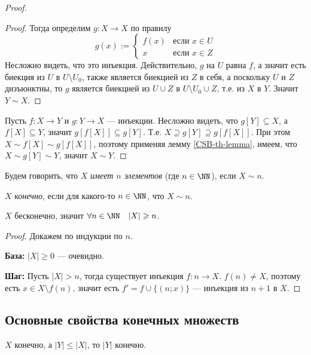 \documentclass[12pt,a4paper]{article}
\begin{document}
\begin{proof}
\begin{proof}
            Тогда определим $g: X \to X$ по правилу
            \[g(x) := \begin{cases}
                f(x) & \text{если $x \in U$}\\
                x & \text{если $x \in Z$}
            \end{cases}\]
            Несложно видеть, что это инъекция. Действительно, $g$ на $U$ равна $f$, а значит есть биекция из $U$ в $U\setminus U_0$, также является биекцией из $Z$ в себя, а поскольку $U$ и $Z$ дизъюнктны, то $g$ является биекцией из $U \cup Z$ в $U\setminus U_0 \cup Z$, т.е. из $X$ в $Y$. Значит $Y \sim X$.
        \end{proof}

        Пусть $f: X \to Y$ и $g: Y \to X$ --- инъекции. Несложно видеть, что $g[Y] \subseteq X$, а $f[X] \subseteq Y$, значит $g[f[X]] \subseteq g[Y]$. Т.е. $X \supseteq g[Y] \supseteq g[f[X]]$. При этом $X \sim f[X] \sim g[f[X]]$, поэтому применяя лемму \ref{CSB-th-lemma}, имеем, что $X \sim g[Y] \sim Y$, значит $X \sim Y$.
    \end{proof}

    \begin{definition}
        Будем говорить, что $X$ \emph{имеет $n$ элементов} (где $n \in \NN$), если $X \sim n$.

        $X$ \emph{конечно}, если для какого-то $n\in \NN$, что $X \sim n$.
    \end{definition}

    \begin{statement}
        $X$ бесконечно, значит $\forall n\in\NN\quad |X| \geqslant n$.
    \end{statement}

    \begin{proof}
        Докажем по индукции по $n$.

        \textbf{База:} $|X| \geqslant 0$ --- очевидно.

        \textbf{Шаг:} Пусть $|X| > n$, тогда существует инъекция $f: n \to X$. $f(n) \neq X$, поэтому есть $x \in X\setminus f(n)$, значит есть $f' = f \cup \{(n; x)\}$ --- инъекция из $n+1$ в $X$.
    \end{proof}

    \subsection{Основные свойства конечных множеств}

    \begin{statement}
        $X$ конечно, а $|Y| \leqslant |X|$, то $|Y|$ конечно.
    \end{statement}
\end{document}
